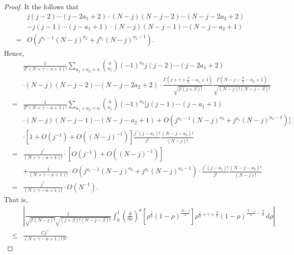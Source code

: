 \documentclass[10pt,a4paper]{amsart}
\begin{document}
\begin{proof}
It the follows that
\begin{eqnarray*}
&&j(j-2)\cdots\left(j-2a_1+2\right)\cdot(N-j)(N-j-2)\cdots\left(N-j-2a_2+2\right)\\
&&-j(j-1)\cdots\left(j-a_1+1\right)\cdot(N-j)(N-j-1)\cdots\left(N-j-a_2+1\right)\\
&=&O\left(j^{a_1-1}(N-j)^{a_2}+j^{a_1}(N-j)^{a_2-1}\right).
\end{eqnarray*}
Hence,
\begin{eqnarray*}
&&\frac{1}{2^a(N+\gamma-a+1)!}\sum_{a_1+a_2=a}{a\choose a_1}(-1)^{a_2}j(j-2)\cdots\left(j-2a_1+2\right)\\
&&\cdot(N-j)(N-j-2)\cdots\left(N-j-2a_2+2\right)\cdot\frac{\Gamma\left(j+\gamma+\frac\beta2-a_1+1\right)}{\sqrt{j!(j+\beta)!}}\frac{\Gamma\left(N-j-\frac\beta2-a_2+1\right)}{\sqrt{(N-j)!(N-j-\beta)!}}\\
&=&\frac{1}{2^a(N+\gamma-a+1)!}\sum_{a_1+a_2=a}{a\choose a_1}(-1)^{a_2}\Big[j(j-1)\cdots\left(j-a_1+1\right)\\
&&\cdot(N-j)(N-j-1)\cdots\left(N-j-a_2+1\right)+O\left(j^{a_1-1}(N-j)^{a_2}+j^{a_1}(N-j)^{a_2-1}\right)\Big]\\&&\cdot\left[1+O\left(j^{-1}\right)+O\left((N-j)^{-1}\right)\right]\frac{j^\gamma\left(j-a_1\right)!}{j!}\frac{\left(N-j-a_2\right)!}{(N-j)!}\\
&=&\frac{j^\gamma}{(N+\gamma-a+1)!}\cdot\left[O\left(j^{-1}\right)+O\left((N-j)^{-1}\right)\right]\\
&&+\frac{1}{(N+\gamma-a+1)!}\cdot O\left(j^{a_1-1}(N-j)^{a_2}+j^{a_1}(N-j)^{a_2-1}\right)\cdot\frac{j^\gamma\left(j-a_1\right)!}{j!}\frac{\left(N-j-a_2\right)!}{(N-j)!}\\
&=&\frac{j^\gamma}{(N+\gamma-a+1)!}\cdot O\left(N^{-1}\right).
\end{eqnarray*}
That is,
\begin{eqnarray*}
&&\left|\frac{1}{\sqrt{j!(N-j)!}\sqrt{(j+\beta)!(N-j-\beta)!}}\int_0^1\left(\frac{d}{d\rho}\right)^a\left[\rho^\frac j2(1-\rho)^{\frac{N-j}{2}}\right]\rho^{\frac j2+\gamma+\frac\beta2}(1-\rho)^{\frac{N-j}{2}-\frac\beta2}\,d\rho\right|\\
&\le&\frac{Cj^\gamma}{(N+\gamma-a+1)!N}.
\end{eqnarray*}
\end{proof}
\end{document}
